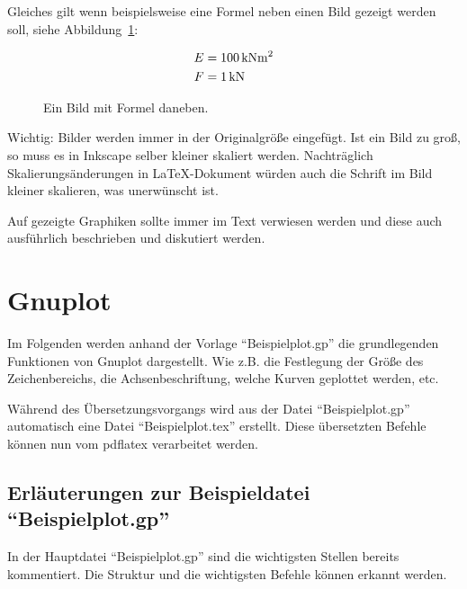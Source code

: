 Gleiches gilt wenn beispielsweise eine Formel neben einen Bild gezeigt werden
soll, siehe Abbildung~\ref{fig:Bild_mit_Formel}:
\begin{figure}[t]
\begin{minipage}{10cm}
\centering
    
\end{minipage}
\begin{minipage}{4cm}
\begin{align*}
E &= 100 \,\mathrm{kNm^2} \\
F &= 1 \,\mathrm{kN}
\end{align*}
\end{minipage}
\caption{Ein Bild mit Formel daneben.}
\label{fig:Bild_mit_Formel}
\end{figure}

Wichtig: Bilder werden immer in der Originalgröße eingefügt. Ist ein Bild zu
groß, so muss es in Inkscape selber kleiner skaliert werden. Nachträglich
Skalierungsänderungen in \LaTeX-Dokument würden auch die Schrift im Bild kleiner
skalieren, was unerwünscht ist.

Auf gezeigte Graphiken sollte immer im Text verwiesen werden und diese auch
ausführlich beschrieben und diskutiert werden.


\section{Gnuplot}
Im Folgenden werden anhand der Vorlage "`Beispielplot.gp"' die grundlegenden
Funktionen von Gnuplot dargestellt. Wie z.B. die Festlegung der Größe des
Zeichenbereichs, die Achsenbeschriftung, welche Kurven geplottet werden, etc.

Während des Übersetzungsvorgangs wird aus der Datei "`Beispielplot.gp"'
automatisch eine Datei "`Beispielplot.tex"' erstellt. Diese übersetzten Befehle
können nun vom pdflatex verarbeitet werden.

\subsection{Erläuterungen zur Beispieldatei "`Beispielplot.gp"'}
In der Hauptdatei "`Beispielplot.gp"' sind die wichtigsten Stellen bereits
kommentiert. Die Struktur und die wichtigsten Befehle können erkannt werden.

